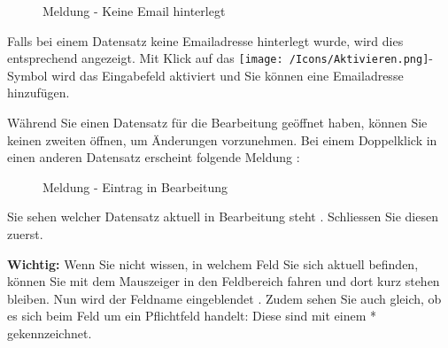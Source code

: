 \begin{figure}[H]
\caption{Meldung - Keine Email hinterlegt}
\end{figure}

Falls bei einem Datensatz keine Emailadresse hinterlegt wurde, wird dies entsprechend angezeigt. Mit Klick auf das \texttt{[image: /Icons/Aktivieren.png]}-Symbol  wird das Eingabefeld aktiviert und Sie können eine Emailadresse hinzufügen.

\vspace{\baselineskip}

Während Sie einen Datensatz für die Bearbeitung geöffnet haben, können Sie keinen zweiten öffnen, um Änderungen vorzunehmen. Bei einem Doppelklick in einen anderen Datensatz erscheint folgende Meldung :

\begin{figure}[H]
\caption{Meldung - Eintrag in Bearbeitung}
\end{figure}

Sie sehen welcher Datensatz aktuell in Bearbeitung steht . Schliessen Sie diesen zuerst.

\textbf{Wichtig:} Wenn Sie nicht wissen, in welchem Feld Sie sich aktuell befinden, können Sie mit dem Mauszeiger in den Feldbereich fahren und dort kurz stehen bleiben. Nun wird der Feldname eingeblendet . Zudem sehen Sie auch gleich, ob es sich beim Feld um ein Pflichtfeld handelt: Diese sind mit einem * gekennzeichnet. 

